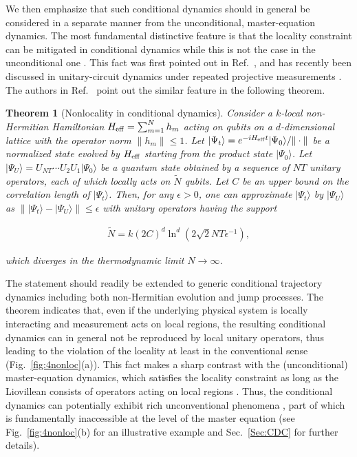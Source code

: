 \documentclass{tADP2e}
\theoremstyle{plain}
\newcommand{\eqn}[1]{
\begin{eqnarray}
	#1
\end{eqnarray}
}
\theoremstyle{plain}
\newtheorem{theorem}{Theorem}[section]
\theoremstyle{definition}
\begin{document}
We then emphasize that such conditional dynamics should in general be considered in a separate manner from the unconditional, master-equation dynamics. The most fundamental distinctive feature is that the locality constraint can be mitigated in conditional dynamics while this is not the case in the unconditional one \cite{PD10,BT12,KM14b}. This fact was first pointed out in Ref.~\cite{YA18}, and has recently been discussed in unitary-circuit dynamics under repeated projective measurements \cite{LY20}.
The authors in Ref.~\cite{MM20} point out the similar feature in the following theorem.
\begin{theorem}[Nonlocality in conditional dynamics]\label{nonloctheoremnum} Consider a $k$-local non-Hermitian Hamiltonian $H_{\rm eff}=\sum_{m=1}^{N}h_m$ acting on qubits on a $d$-dimensional lattice with the operator norm ${\|h_m\|}\leq 1$. Let ${|\Psi_t\rangle={e^{-iH_{\rm eff}t}|\Psi_0\rangle}/{{\|\cdot\|}}}$ be a normalized state evolved by $H_{\rm eff}$ starting from the product state $|\Psi_0\rangle$. 
 Let $|\Psi_U\rangle=U_{NT}\cdots U_{2}U_{1}|\Psi_0\rangle$ be a quantum state obtained by a sequence of $NT$ unitary operators,  each of which locally acts on $\tilde{N}$ qubits. Let $C$ be an upper bound on the correlation length of $|\Psi_t\rangle$. Then, for any $\epsilon>0$, one can approximate $|\Psi_t\rangle$ by $|\Psi_U\rangle$ as ${\| |\Psi_t\rangle-|\Psi_U\rangle\|}\leq \epsilon$ with  unitary operators having the support 
 \eqn{\tilde{N}=k(2C)^d\ln^d\left(2\sqrt{2}NT\epsilon^{-1}\right),\label{nonlocthm}}
 which diverges in the thermodynamic limit $N\to\infty$.
\end{theorem}
\noindent The  statement should readily be extended to generic conditional trajectory dynamics including both non-Hermitian evolution and jump processes. The theorem indicates that, even if the underlying physical system is locally interacting and measurement acts on local regions, the resulting conditional dynamics can in general not be reproduced by local unitary operators, thus leading to the violation of the locality at least in the conventional sense (Fig.~\ref{fig:4nonloc}(a)). 
This fact makes a sharp contrast with the (unconditional) master-equation dynamics, which satisfies the locality constraint as long as the Liovillean consists of operators acting on local regions \cite{PD10,BT12,KM14b}. 
Thus, the conditional dynamics can potentially exhibit rich unconventional phenomena \cite{DAJ09,LTE14,KS14,WAC15,WAC16,KW17,YA18,YA18therm,JJS18,MK18,LY18,CA19,SB19,YF20,MN19}, part of which is fundamentally inaccessible at the level of the master equation (see Fig.~\ref{fig:4nonloc}(b) for an illustrative example and Sec.~\ref{Sec:CDC} for further details).
\end{document}
